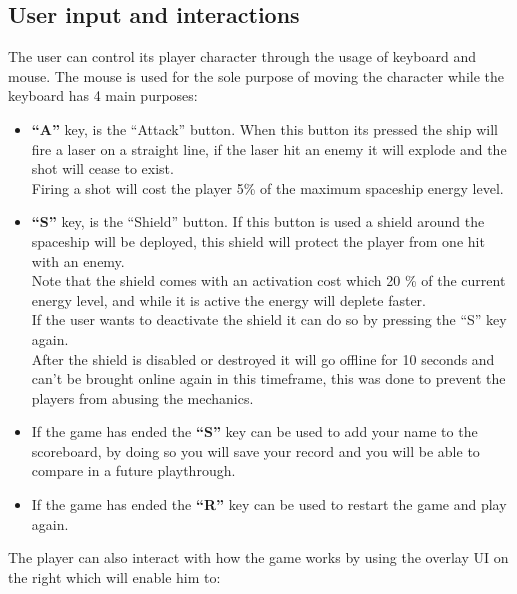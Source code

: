 \documentclass[a4paper,11pt]{article}
\begin{document}
\subsection{User input and interactions}
The user can control its player character through the usage of keyboard and mouse.
The mouse is used for the sole purpose of moving the character while the keyboard has 4 main purposes:
\begin{itemize}
\item  \textbf{``A''} key, is the ``Attack'' button. When this button its pressed the ship will fire a laser on a straight line, if the laser hit an enemy it will explode and the shot will cease to exist.\\Firing a shot will cost the player 5\% of the maximum spaceship energy level.
\item \textbf{``S''} key, is the ``Shield'' button. If this button is used a shield around the spaceship will be deployed, this shield will protect the player from one hit with an enemy.\\Note that the shield comes with an activation cost which 20 \% of the current energy level, and while it is active the energy will deplete faster.\\
If the user wants to deactivate the shield it can do so by pressing the ``S'' key again.\\
After the shield is disabled or destroyed it will go offline for 10 seconds and can't be brought online again in this timeframe, this was done to prevent the players from abusing the mechanics.
\item If the game has ended the \textbf{``S''} key can be used to add your name to the scoreboard, by doing so you will save your record and you will be able to compare in a future playthrough.
\item If the game has ended the \textbf{``R''} key can be used to restart the game and play again.
\end{itemize}
The player can also interact with how the game works by using the overlay UI on the right which will enable him to:
\end{document}
